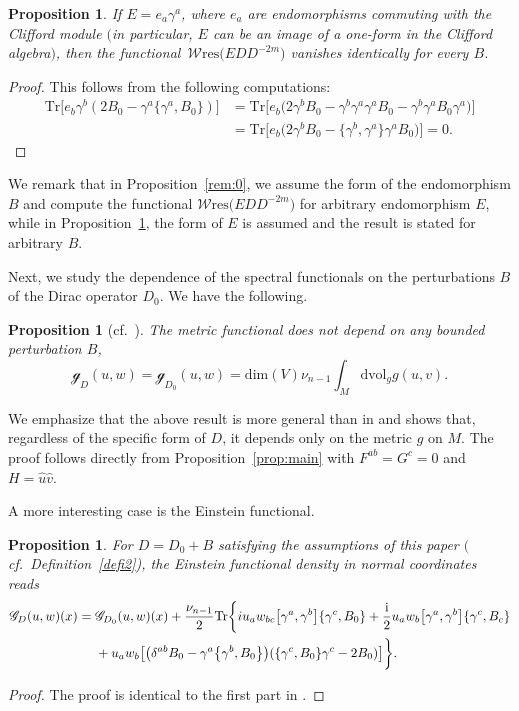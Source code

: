 \documentclass[pdftex]{sigma}
\numberwithin{equation}{section}
\newtheorem{Proposition}[Theorem]{Proposition}
\theoremstyle{definition}
\def\W{\mathscr{W} \mathrm{res}}
\def\Tr{\mathrm{Tr}}
\def\dv{\mathrm{dvol}_g}
\begin{document}
\begin{Proposition}
	\label{rem:1}
	If $E=e_a\gamma^a$, where $e_a$ are endomorphisms commuting with the Clifford module $($in particular, $E$ can be an image of a one-form in the Clifford algebra$)$, then the functional~$\W\bigl(EDD^{-2m}\bigr)$ vanishes identically for every $B$.
\end{Proposition}
\begin{proof}
	This follows from the following computations:
		\begin{align*}
			\Tr\bigl[e_b\gamma^b(2B_0-\gamma^a\{\gamma^a,B_0\})\bigr]&=\Tr \bigl[e_b\bigl(2\gamma^bB_0-\gamma^b\gamma^a\gamma^aB_0-\gamma^b\gamma^aB_0\gamma^a\bigr)\bigr]\\
			&=\Tr \bigl[ e_b\bigl(2\gamma^bB_0-\bigl\{\gamma^b,\gamma^a\bigr\}\gamma^aB_0\bigr)\bigr]=0.\tag*{\qed}
		\end{align*}\renewcommand{\qed}{}
\end{proof}

We remark that in Proposition~\ref{rem:0}, we assume the form of the endomorphism $B$ and compute the functional $\W\bigl(EDD^{-2m}\bigr)$ for arbitrary endomorphism $E$, while in Proposition~\ref{rem:1}, the form of $E$ is assumed and the result is stated for arbitrary $B$.

Next, we study the dependence of the spectral functionals on the perturbations $B$ of the Dirac operator $D_0$. We have the following.


\begin{Proposition}[{cf.\ \cite[Theorem~4.1]{dabrowski2023}}]
	\label{prop:met}
	The metric functional does not depend on any bounded perturbation $B$,
	\[
		\mathscr{g}_D(u,w) = \mathscr{g}_{D_0}(u,w) = \mathrm{dim}(V)
		\nu_{n-1} \int_M \dv g(u,v).
	\]
\end{Proposition}
We emphasize that the above result is more general than in \cite[Theorem~4.1]{dabrowski2023} and shows that, regardless of the specific form of $D$, it depends only on the metric $g$ on $M$. The proof follows directly from Proposition~\ref{prop:main} with $F^{ab}=G^c=0$ and $H=\hat{u}\hat{v}$.

A more interesting case is the Einstein functional.
\begin{Proposition}
	\label{prop:Ein}
	For $D=D_0+B$ satisfying the assumptions of this paper $($cf.\ Definition~{\rm\ref{defi2})}, the Einstein functional density in normal coordinates reads
		\begin{align*}%
			\mathscr{G}_D(u,w)(x)={} &\mathscr{G}_{D_0}(u,w)(x)
			+\frac{\nu_{n-1}}{2} %
			\Tr\biggl\{ iu_aw_{bc}\big[\gamma^a,\gamma^b\big]\{\gamma^c, B_0\}+\frac{\rm i}{2}u_aw_{b}\bigl[\gamma^a,\gamma^b\bigr]\{\gamma^c, B_c\} \\
			& +u_aw_b\bigl[\bigl(\delta^{ab}B_0-\gamma^a\bigl\{\gamma^b,B_0\bigr\}\bigr)(\{\gamma^c,B_0\}\gamma^c-2B_0)\bigr]\biggr\}.
		\end{align*}
\end{Proposition}
\begin{proof}
	The proof is identical to the first part in \cite[Proposition~II.1]{bochniak2025}.
\end{proof}
\end{document}
